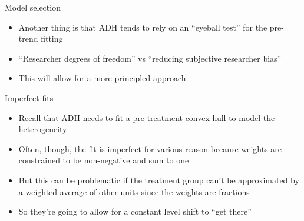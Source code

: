 \documentclass{beamer}
\begin{document}
\begin{frame}{Model selection}

\begin{itemize}
\item Another thing is that ADH tends to rely on an ``eyeball test'' for the pre-trend fitting
\item ``Researcher degrees of freedom'' vs ``reducing subjective researcher bias''
\item This will allow for a more principled approach
\end{itemize}

\end{frame}

\begin{frame}{Imperfect fits}

\begin{itemize}
\item Recall that ADH needs to fit a pre-treatment convex hull to model the heterogeneity
\item Often, though, the fit is imperfect for various reason because weights are constrained to be non-negative and sum to one
\item But this can be problematic if the treatment group can't be approximated by a weighted average of other units since the weights are fractions 
\item So they're going to allow for a constant level shift to ``get there''
\end{itemize}

\end{frame}
\end{document}
